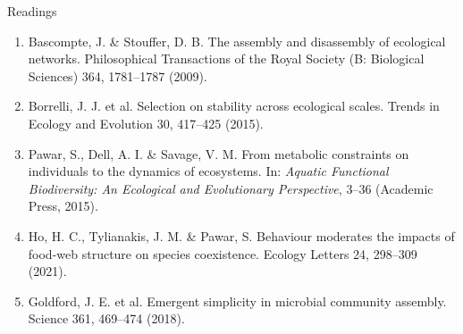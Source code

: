   
  \begin{frame}{Readings}
  
  \begin{enumerate}\setlength{\itemindent}{-2em}\itemsep4pt
  

    \item Bascompte, J. \& Stouffer, D. B. The assembly and disassembly of ecological networks. Philosophical Transactions of the Royal Society (B: Biological Sciences) 364, 1781--1787 (2009).

    \item Borrelli, J. J. et al. Selection on stability across ecological scales. Trends in Ecology and Evolution 30, 417--425 (2015).

    \item Pawar, S., Dell, A. I. \& Savage, V. M. From metabolic constraints on individuals to the dynamics of ecosystems. In: {\it Aquatic Functional Biodiversity: An Ecological and Evolutionary Perspective}, 3--36 (Academic Press, 2015).
    
    
    
    \item Ho, H. C., Tylianakis, J. M. \& Pawar, S. Behaviour moderates the impacts of food-web structure on species coexistence. Ecology Letters 24, 298--309 (2021).
    
    \item Goldford, J. E. et al. Emergent simplicity in microbial community assembly. Science 361, 469--474 (2018).

\end{enumerate}
  
\end{frame}

